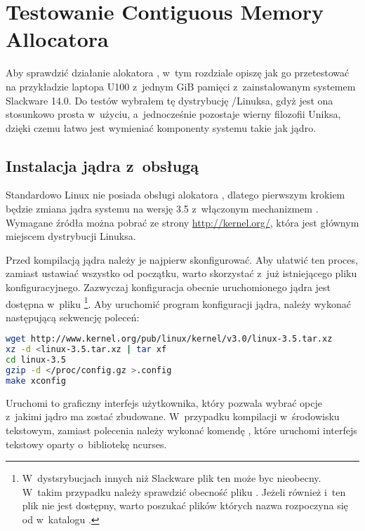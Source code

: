 \chapter{Testowanie Contiguous Memory Allocatora}

Aby sprawdzić działanie alokatora , w~tym rozdziale opiszę
jak go przetestować na przykładzie laptopa  U100 z~jednym
\unit{GiB} pamięci  z~zainstalowanym systemem Slackware 14.0.
Do testów wybrałem tę dystrybucję /Linuksa, gdyż jest ona
stosunkowo prosta w~użyciu, a~jednocześnie pozostaje wierny filozofii
Uniksa, dzięki czemu łatwo jest wymieniać komponenty systemu takie jak
jądro.


\section{Instalacja jądra z~obsługą }

Standardowo Linux nie posiada obsługi alokatora , dlatego
pierwszym krokiem będzie zmiana jądra systemu na wersję 3.5
z~włączonym mechanizmem .  Wymagane źródła można pobrać ze
strony \url{http://kernel.org/}, która jest głównym miejscem
dystrybucji Linuksa.

Przed kompilacją jądra należy je najpierw skonfigurować.  Aby ułatwić
ten proces, zamiast ustawiać wszystko od początku, warto skorzystać
z~już istniejącego pliku konfiguracyjnego.  Zazwyczaj konfiguracja
obecnie uruchomionego jądra jest dostępna w~pliku
\footnote{W~dystsrybucjach innych niż Slackware
  plik ten może byc nieobecny.  W~takim przypadku należy sprawdzić
  obecność pliku .  Jeżeli również i~ten plik nie
  jest dostępny, warto poszukać plików których nazwa rozpoczyna się od
   w~katalogu .}.  Aby uruchomić program
konfiguracji jądra, należy wykonać następującą sekwencję poleceń:

\begin{lstlisting}[language=sh,numbers=none,columns=fullflexible]
wget http://www.kernel.org/pub/linux/kernel/v3.0/linux-3.5.tar.xz
xz -d <linux-3.5.tar.xz | tar xf
cd linux-3.5
gzip -d </proc/config.gz >.config
make xconfig
\end{lstlisting}

Uruchomi to graficzny interfejs użytkownika, który pozwala wybrać
opcje z~jakimi jądro ma zostać zbudowane.  W~przypadku kompilacji
w~środowisku tekstowym, zamiast polecenia  należy
wykonać komendę , które uruchomi interfejs
tekstowy oparty o~bibliotekę ncurses.


